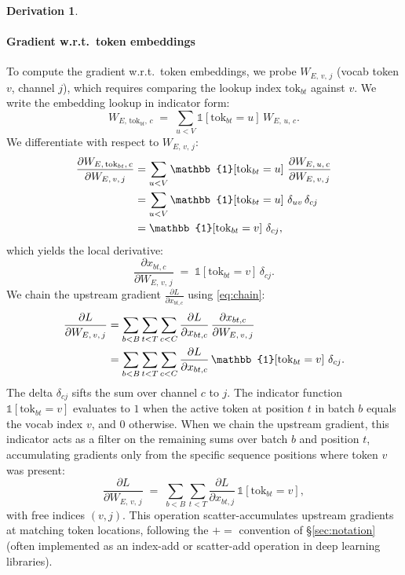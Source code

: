\documentclass[letterpaper, 10 pt, conference]{ieeeconf}
\newcommand{\pdv}[2]{\frac{\partial #1}{\partial #2}}
\newcommand{\dL}[1]{\pdv{L}{#1}}
\newcommand{\ind}[1]{\mathbb{1}\!\left[#1\right]}
\newcommand{\kron}[2]{\delta_{#1 #2}}
\theoremstyle{definition}
\newtheorem*{derivation}{Derivation}
\begin{document}
\begin{derivation}
  \paragraph{Gradient w.r.t.\ token embeddings}
  To compute the gradient w.r.t.\ token embeddings, we probe $W_{E,\, v,\, j}$ (vocab token $v$, channel $j$), which requires comparing the lookup index $\mathrm{tok}_{bt}$ against $v$. We write the embedding lookup in indicator form:
  \begin{equation}
    W_{E,\, \mathrm{tok}_{bt},\, c} \;=\; \sum_{u<V} \ind{\mathrm{tok}_{bt} = u}\,W_{E,\, u,\, c}.
  \end{equation}
  We differentiate with respect to $W_{E,\, v,\, j}$:
  \begin{align}
    \pdv{W_{E,\, \mathrm{tok}_{bt},\, c}}{W_{E,\, v,\, j}}
     & = \sum_{u<V} \ind{\mathrm{tok}_{bt} = u}\,\pdv{W_{E,\, u,\, c}}{W_{E,\, v,\, j}} \notag \\
     & = \sum_{u<V} \ind{\mathrm{tok}_{bt} = u}\,\kron{u}{v}\,\kron{c}{j} \notag               \\
     & = \ind{\mathrm{tok}_{bt} = v}\,\kron{c}{j},
    \label{eq:enc-dxdwe-local}
  \end{align}
  which yields the local derivative:
  \begin{equation}
    \pdv{x_{bt, c}}{W_{E,\, v,\, j}} \;=\; \ind{\mathrm{tok}_{bt} = v}\,\kron{c}{j}.
    \label{eq:enc-dxdwe}
  \end{equation}
  We chain the upstream gradient $\dL{x_{bt, c}}$ using \eqref{eq:chain}:
  \begin{align}
    \dL{W_{E,\, v,\, j}}
     & = \sum_{b<B} \sum_{t<T} \sum_{c<C} \dL{x_{bt, c}}\,\pdv{x_{bt, c}}{W_{E,\, v,\, j}} \notag   \\
     & = \sum_{b<B} \sum_{t<T} \sum_{c<C} \dL{x_{bt, c}}\,\ind{\mathrm{tok}_{bt} = v}\,\kron{c}{j}.
  \end{align}
  The delta $\kron{c}{j}$ sifts the sum over channel $c$ to $j$. The indicator function $\ind{\mathrm{tok}_{bt} = v}$ evaluates to $1$ when the active token at position $t$ in batch $b$ equals the vocab index $v$, and $0$ otherwise. When we chain the upstream gradient, this indicator acts as a filter on the remaining sums over batch $b$ and position $t$, accumulating gradients only from the specific sequence positions where token $v$ was present:
  \begin{equation}
    \dL{W_{E,\, v,\, j}} \;=\; \sum_{b<B} \sum_{t<T} \dL{x_{bt, j}}\,\ind{\mathrm{tok}_{bt} = v},
    \label{eq:enc-we-bwd-idx}
  \end{equation}
  with free indices $(v, j)$. This operation scatter-accumulates upstream gradients at matching token locations, following the $\mathrel{+}=$ convention of \S\ref{sec:notation} (often implemented as an index-add or scatter-add operation in deep learning libraries).
\end{derivation}
\end{document}
